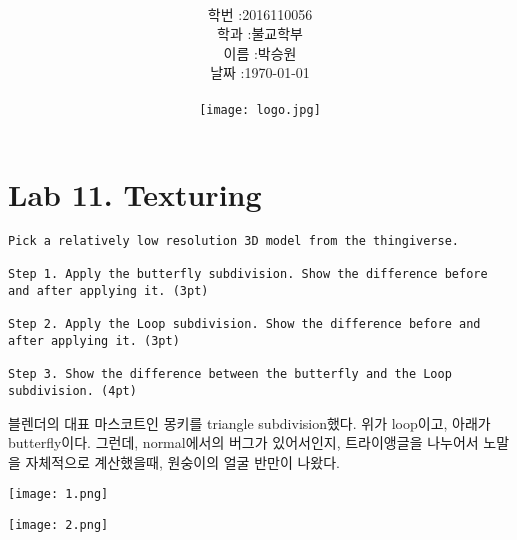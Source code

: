 \documentclass[12pt,a4paper]{article}
\title{
	\centering
	\pgfornament[width=12cm,color=teal]{84}\\
	\vspace{1cm}
	\fontsize{50}{50} \selectfont {컴퓨터 그래픽스 입문}\\
		\pgfornament[width=12cm,color=teal]{88}\\
	\vfill}
\author{
	\LARGE
	\begin{tabular}{rl}
		\hline
		학번 : & 2016110056\\ 
		학과 : & 불교학부 \\
		이름 : & 박승원\\
		날짜 : & \today\\
		\hline
	\end{tabular}\vspace{2cm}
	\\
\texttt{[image: logo.jpg]}
	}
\date{}
\begin{document}
\maketitle
{}
\noindent
\lstset{language=C++, columns=flexible, tabsize=4, frame=shadowbox, showstringspaces=false, breaklines=true, upquote=true, basicstyle=\normalsize}
\newpage
\section*{Lab 11. Texturing}
	
\begin{verbatim}
Pick a relatively low resolution 3D model from the thingiverse.

Step 1. Apply the butterfly subdivision. Show the difference before and after applying it. (3pt)

Step 2. Apply the Loop subdivision. Show the difference before and after applying it. (3pt)

Step 3. Show the difference between the butterfly and the Loop subdivision. (4pt)
\end{verbatim}

블렌더의 대표 마스코트인 몽키를 triangle subdivision했다.
위가 loop이고, 아래가 butterfly이다.
그런데, normal에서의 버그가 있어서인지, 트라이앵글을 나누어서 노말을 자체적으로 계산했을때,
원숭이의 얼굴 반만이 나왔다.

\texttt{[image: 1.png]}

\texttt{[image: 2.png]}


\end{document}
